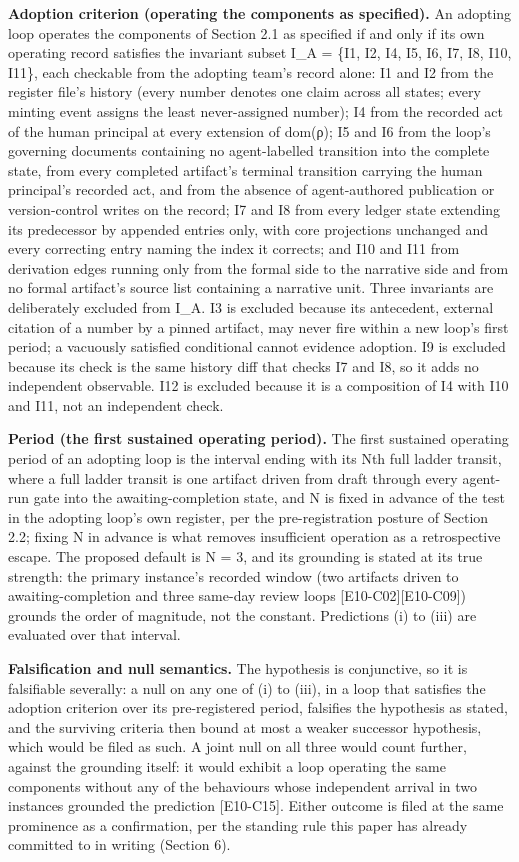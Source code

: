 \documentclass[
  11pt,
]{article}
\begin{document}
\textbf{Adoption criterion (operating the components as specified).} An
adopting loop operates the components of Section 2.1 as specified if and
only if its own operating record satisfies the invariant subset I\_A =
\{I1, I2, I4, I5, I6, I7, I8, I10, I11\}, each checkable from the
adopting team's record alone: I1 and I2 from the register file's history
(every number denotes one claim across all states; every minting event
assigns the least never-assigned number); I4 from the recorded act of
the human principal at every extension of dom(ρ); I5 and I6 from the
loop's governing documents containing no agent-labelled transition into
the complete state, from every completed artifact's terminal transition
carrying the human principal's recorded act, and from the absence of
agent-authored publication or version-control writes on the record; I7
and I8 from every ledger state extending its predecessor by appended
entries only, with core projections unchanged and every correcting entry
naming the index it corrects; and I10 and I11 from derivation edges
running only from the formal side to the narrative side and from no
formal artifact's source list containing a narrative unit. Three
invariants are deliberately excluded from I\_A. I3 is excluded because
its antecedent, external citation of a number by a pinned artifact, may
never fire within a new loop's first period; a vacuously satisfied
conditional cannot evidence adoption. I9 is excluded because its check
is the same history diff that checks I7 and I8, so it adds no
independent observable. I12 is excluded because it is a composition of
I4 with I10 and I11, not an independent check.

\textbf{Period (the first sustained operating period).} The first
sustained operating period of an adopting loop is the interval ending
with its Nth full ladder transit, where a full ladder transit is one
artifact driven from draft through every agent-run gate into the
awaiting-completion state, and N is fixed in advance of the test in the
adopting loop's own register, per the pre-registration posture of
Section 2.2; fixing N in advance is what removes insufficient operation
as a retrospective escape. The proposed default is N = 3, and its
grounding is stated at its true strength: the primary instance's
recorded window (two artifacts driven to awaiting-completion and three
same-day review loops {[}E10-C02{]}{[}E10-C09{]}) grounds the order of
magnitude, not the constant. Predictions (i) to (iii) are evaluated over
that interval.

\textbf{Falsification and null semantics.} The hypothesis is
conjunctive, so it is falsifiable severally: a null on any one of (i) to
(iii), in a loop that satisfies the adoption criterion over its
pre-registered period, falsifies the hypothesis as stated, and the
surviving criteria then bound at most a weaker successor hypothesis,
which would be filed as such. A joint null on all three would count
further, against the grounding itself: it would exhibit a loop operating
the same components without any of the behaviours whose independent
arrival in two instances grounded the prediction {[}E10-C15{]}. Either
outcome is filed at the same prominence as a confirmation, per the
standing rule this paper has already committed to in writing (Section
6).
\end{document}
